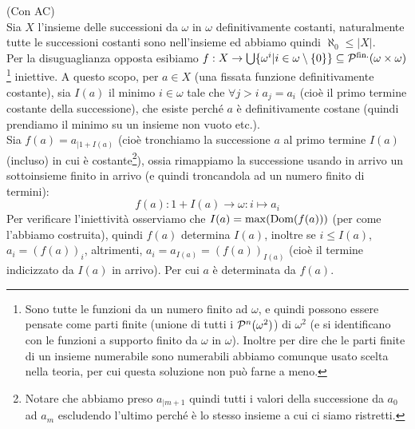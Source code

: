 \begin{soln}
	(Con AC)\\
	Sia $X$ l'insieme delle successioni da $\omega$ in $\omega$ definitivamente costanti, naturalmente tutte le successioni costanti sono nell'insieme ed abbiamo quindi $\aleph_0 \leq |X|$.\\
	Per la disuguaglianza opposta esibiamo $f : X \to \bigcup\{\omega^i | i \in \omega\setminus\{0\}\} \subseteq \mathcal{P}^{\text{fin.}}(\omega \times \omega)$\footnote{Sono tutte le funzioni da un numero finito ad $\omega$, e quindi possono essere pensate come parti finite (unione di tutti i $\mathcal{P}^{n}(\omega^2)$) di $\omega^2$ (e si identificano con le funzioni a supporto 
	finito da $\omega$ in $\omega$). Inoltre per dire che le parti finite di un insieme numerabile sono numerabili abbiamo comunque usato scelta nella teoria, per cui questa soluzione non pu\`o farne a meno.} iniettive. A questo scopo, per $a \in X$ (una fissata funzione definitivamente costante), sia $I(a)$ il minimo $i \in \omega$ tale che $\forall j > i \; a_j = a_i$ (cio\`e il primo termine costante della successione), che esiste perch\'e $a$ \`e definitivamente costane (quindi prendiamo il minimo su un insieme non vuoto etc.).\\
	Sia $f(a) = a_{|1+I(a)}$ (cio\`e tronchiamo la successione $a$ al primo termine $I(a)$ (incluso) in cui \`e costante\footnote{Notare che abbiamo preso $a_{|m+1}$ quindi tutti i valori della successione da $a_0$ ad $a_m$ escludendo l'ultimo perch\'e \`e lo stesso insieme a cui ci siamo ristretti.}), ossia rimappiamo la successione usando in arrivo un sottoinsieme finito in arrivo (e quindi troncandola ad un numero finito di termini):
	\[  f(a) : 1 + I(a) \to \omega : i \mapsto a_i
		\]
	Per verificare l'iniettivit\`a osserviamo che $I(a) = \max(\operatorname{Dom}(f(a)))$ (per come l'abbiamo costruita), quindi $f(a)$ determina $I(a)$, inoltre se $i \leq I(a)$, $a_i = (f(a))_i$, altrimenti, $a_i = a_{I(a)} = (f(a))_{I(a)}$ (cio\`e il termine indicizzato da $I(a)$ in arrivo). Per cui $a$ \`e determinata da $f(a)$.
\end{soln}

